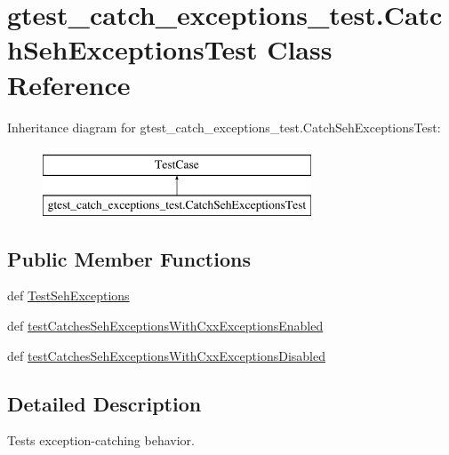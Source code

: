 \hypertarget{classgtest__catch__exceptions__test_1_1_catch_seh_exceptions_test}{\section{gtest\-\_\-catch\-\_\-exceptions\-\_\-test.\-Catch\-Seh\-Exceptions\-Test Class Reference}
\label{classgtest__catch__exceptions__test_1_1_catch_seh_exceptions_test}
}
Inheritance diagram for gtest\-\_\-catch\-\_\-exceptions\-\_\-test.\-Catch\-Seh\-Exceptions\-Test\-:\begin{figure}[H]
\begin{center}
\leavevmode
\includegraphics[height=2.000000cm]{classgtest__catch__exceptions__test_1_1_catch_seh_exceptions_test}
\end{center}
\end{figure}
\subsection*{Public Member Functions}
\begin{DoxyCompactItemize}
\item 
def \hyperlink{classgtest__catch__exceptions__test_1_1_catch_seh_exceptions_test_a7edb1863e495845d38441fbf3aad911e}{Test\-Seh\-Exceptions}
\item 
def \hyperlink{classgtest__catch__exceptions__test_1_1_catch_seh_exceptions_test_a93d8475a51c291ec1c07c8661433d44a}{test\-Catches\-Seh\-Exceptions\-With\-Cxx\-Exceptions\-Enabled}
\item 
def \hyperlink{classgtest__catch__exceptions__test_1_1_catch_seh_exceptions_test_a46922b2dec664613d382efaebcd501e1}{test\-Catches\-Seh\-Exceptions\-With\-Cxx\-Exceptions\-Disabled}
\end{DoxyCompactItemize}


\subsection{Detailed Description}
\begin{DoxyVerb}Tests exception-catching behavior.\end{DoxyVerb}
 

